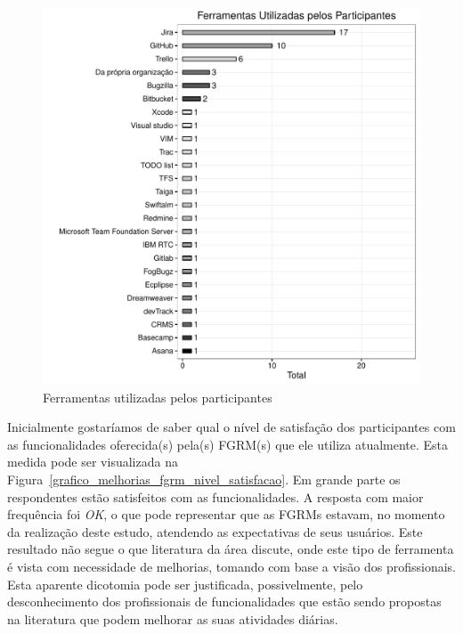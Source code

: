 \begin{figure}[htpb]
	\centering
	\includegraphics[width=0.8\linewidth]{./chapter-pesquisa-com-profissionais/img/grafico_melhorias_fgrm_ferramentas_utilizadas.pdf}
	\caption{Ferramentas utilizadas pelos participantes}
\label{fig:grafico_melhorias_fgrm_ferramentas_utilizadas}
\end{figure}

Inicialmente gostaríamos de saber qual o nível de satisfação dos participantes
com as funcionalidades oferecida(s) pela(s) FGRM(s) que ele utiliza atualmente.
Esta medida pode ser visualizada na
Figura~\ref{grafico_melhorias_fgrm_nivel_satisfacao}. Em grande parte os
respondentes estão satisfeitos com as funcionalidades. A resposta com maior
frequência foi \textit{OK}, o que pode representar que as FGRMs estavam, no
momento da realização deste estudo, atendendo as expectativas de seus usuários.
Este resultado não segue o que literatura da área discute, onde este tipo de
ferramenta é vista com necessidade de melhorias, tomando com base a visão dos
profissionais. Esta aparente dicotomia pode ser justificada, possivelmente, pelo
desconhecimento dos profissionais de funcionalidades que estão sendo propostas
na literatura que podem melhorar as suas atividades diárias.

